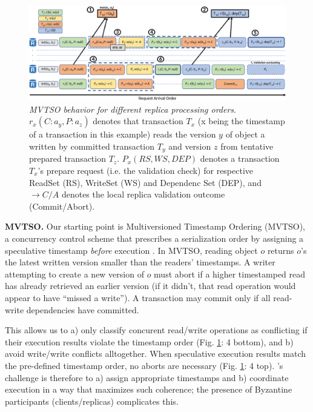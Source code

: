 \begin{figure}
\begin{center}
\includegraphics[width= \textwidth]{./figures/MVTSOLargeFont.png}
\end{center}
\caption{\emph{MVTSO behavior for different replica processing orders}. $r_x(C : a_y ,P : a_z)$ denotes that transaction $T_x$ (x being the timestamp of a transaction in this example) reads the version $y$ of object a written by committed transaction $T_y$ and version $z$ from tentative prepared transaction $T_z$. $P_x(RS,WS,DEP)$ denotes a transaction $T_x$'s prepare request (i.e. the validation check) for respective ReadSet (RS), WriteSet (WS) and Dependenc Set (DEP), and $\rightarrow C / A$ denotes the local replica validation outcome (Commit/Abort).} 
\label{fig:MVTSOEX}
\end{figure}

\par \textbf{MVTSO.} Our starting point is Multiversioned Timestamp Ordering (MVTSO), a concurrency control scheme that prescribes a serialization order by assigning a speculative timestamp \textit{before} execution \cite{bernstein1983multiversion, reed1983implementing, su2017tebaldi}. In MVTSO, reading object $o$  returns $o$'s  the latest written version smaller than the readers' timestamps. A writer attempting to create a new version of $o$  must abort if a higher timestamped read has already retrieved an earlier version (if it didn't, that read operation would appear to have ``missed a write''). A transaction may commit only if all read-write dependencies have committed.

\iffalse
{}  This allows us to a) only classify concurent read/write operations as conflicting if their execution results violate the timestamp order (Fig. \ref{fig:MVTSOEX}: 4 bottom), and b) avoid write/write conflicts alltogether. 
When speculative execution results match the pre-defined timestamp order, no aborts are necessary (Fig. \ref{fig:MVTSOEX}: 4 top). \sys{}'s challenge is therefore to a) assign appropriate timestamps and b) coordinate execution in a way that maximizes such coherence; the presence of Byzantine participants (clients/replicas) complicates this.

